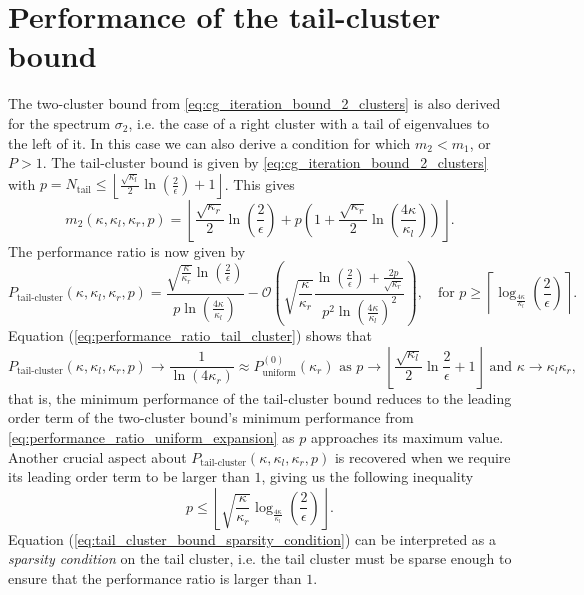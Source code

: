 \section{Performance of the tail-cluster bound}\label{sec:tail_cluster_bound_performance}
The two-cluster bound from \cref{eq:cg_iteration_bound_2_clusters} is also derived for the spectrum $\sigma_2$, i.e. the case of a right cluster with a tail of eigenvalues to the left of it. In this case we can also derive a condition for which $m_2 < m_1$, or $P > 1$. The tail-cluster bound is given by \cref{eq:cg_iteration_bound_2_clusters} with $p = N_{\text{tail}} \leq \left\lfloor\frac{\sqrt{\kappa_l}}{2}\ln\left(\frac{2}{\epsilon}\right) + 1 \right\rfloor $. This gives
\begin{equation}
    m_2(\kappa, \kappa_l, \kappa_r, p) = \left\lfloor
    \frac{\sqrt{\kappa_r}}{2}\ln\left(\frac{2}{\epsilon}\right)
    + p \left(
    1 + \frac{\sqrt{\kappa_r}}{2}\ln\left(\frac{4\kappa}{\kappa_l}\right)
    \right)
    \right\rfloor.
    \label{eq:cg_iteration_bound_tail_cluster}
\end{equation}
The performance ratio is now given by
\begin{equation}
    P_{\text{tail-cluster}}(\kappa, \kappa_l, \kappa_r, p) = \frac{\sqrt{\frac{\kappa}{\kappa_r}}\ln\left(\frac{2}{\epsilon}\right)}{p\ln\left(\frac{4\kappa}{\kappa_l}\right)} - \mathcal{O}\left(\sqrt{\frac{\kappa}{\kappa_r}}\frac{\ln\left(\frac{2}{\epsilon}\right) + \frac{2p}{\sqrt{\kappa_r}}}{p^2\ln\left(\frac{4\kappa}{\kappa_l}\right)^2}\right), \quad \text{for } p \geq \left\lceil\log_{\frac{4\kappa}{\kappa_l}}\left(\frac{2}{\epsilon}\right)\right\rceil.
    \label{eq:performance_ratio_tail_cluster}
\end{equation}
Equation (\ref{eq:performance_ratio_tail_cluster}) shows that
\[
    P_{\text{tail-cluster}}(\kappa, \kappa_l, \kappa_r, p) \longrightarrow \frac{1}{\ln(4\kappa_r)} \approx P^{(0)}_{\text{uniform}}(\kappa_r) \text{ as } p \to \left\lfloor\frac{\sqrt{\kappa_l}}{2}\ln{\frac{2}{\epsilon}} + 1 \right\rfloor \text{ and } \kappa \to \kappa_l\kappa_r,
\]
that is, the minimum performance of the tail-cluster bound reduces to the leading order term of the two-cluster bound's minimum performance from \cref{eq:performance_ratio_uniform_expansion} as $p$ approaches its maximum value. Another crucial aspect about $P_{\text{tail-cluster}}(\kappa, \kappa_l, \kappa_r, p)$ is recovered when we require its leading order term to be larger than $1$, giving us the following inequality
\begin{equation}
    p \leq \left\lfloor\sqrt{\frac{\kappa}{\kappa_r}}\log_{\frac{4\kappa}{\kappa_l}}\left(\frac{2}{\epsilon}\right)\right\rfloor.
    \label{eq:tail_cluster_bound_sparsity_condition}
\end{equation}
Equation (\ref{eq:tail_cluster_bound_sparsity_condition}) can be interpreted as a \textit{sparsity condition} on the tail cluster, i.e. the tail cluster must be sparse enough to ensure that the performance ratio is larger than $1$.

